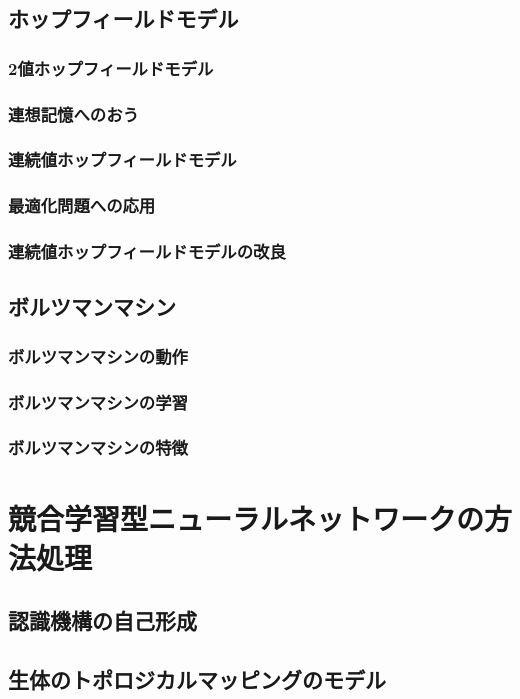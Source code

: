 \documentclass[uplatex, 11pt, a4j, dvipdfmx]{jsarticle}
\begin{document}
    \subsection{ホップフィールドモデル}
      \subsubsection{2値ホップフィールドモデル}
      \subsubsection{連想記憶へのおう }
      \subsubsection{連続値ホップフィールドモデル}
      \subsubsection{最適化問題への応用}
      \subsubsection{連続値ホップフィールドモデルの改良}
    \subsection{ボルツマンマシン}
      \subsubsection{ボルツマンマシンの動作} %
      \subsubsection{ボルツマンマシンの学習}
      \subsubsection{ボルツマンマシンの特徴}

  \section{競合学習型ニューラルネットワークの方法処理}
    \subsection{認識機構の自己形成}
    \subsection{生体のトポロジカルマッピングのモデル}
\end{document}
